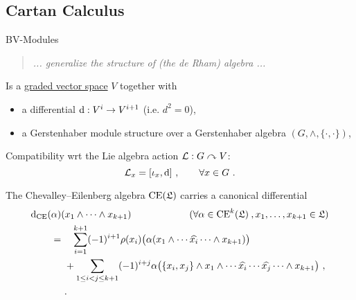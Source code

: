 \documentclass[beamer,10pt]{standalone}
\begin{document}
\subsection{Cartan Calculus}

\begin{frame}{BV-Modules}
  \begin{quote}
    \centering
    \emph{... generalize the structure of (the de Rham) algebra ...}
  \end{quote}
  \begin{defblock}
    Is a \underline{graded vector space} $V$ together with
    \begin{itemize}[label=$\triangleright$]
      \item a differential $\mathop{}\!\mathrm{d}: V^i \to V^{i+1}$ (i.e. $d^2=0$),
      \item a Gerstenhaber module structure over a Gerstenhaber algebra $(G, \wedge, \lbrace\cdot,\cdot\rbrace)$,
    \end{itemize}
    Compatibility wrt the Lie algebra action $\mathcal{L}:G\curvearrowright V$: 
    $$
      \mathcal{L}_x = [\iota_x, \mathop{}\!\mathrm{d}]~, \qquad \forall x \in G~.
    $$
  \end{defblock}
  \vfill\pause

    \begin{exblock}
    The Chevalley--Eilenberg algebra  $\mathrm{CE}(\mathfrak{L})$
    carries a canonical differential
\begin{align*}
	\mathop{}\!\mathrm{d}_{\mathrm{CE}}(\alpha)&(x_1 \wedge \dotsb \wedge x_{k+1})
  \qquad\qquad\qquad {\tiny(
  \forall \alpha \in \mathrm{CE}^k(\mathfrak{L})~, x_1, \dotsc, x_{k+1} \in \mathfrak{L})}
  \\
  =&~\phantom{+} \sum_{i=1}^{k+1} (-1)^{i+1} \rho(x_i)\big(\alpha(x_1 \wedge \dotsb \widehat{x_i} \dotsb \wedge x_{k+1})\big) \\
	&~+ \sum_{1 \leq i < j \leq k+1} (-1)^{i+j} \alpha\big(\lbrace x_i, x_j\rbrace \wedge x_1 \wedge \dotsb \widehat{x_i} \dotsb \widehat{x_j} \dotsb \wedge x_{k+1}\big)~,\\
  &~.
\end{align*}
  \end{exblock}

\end{frame}
\end{document}
